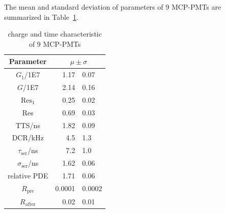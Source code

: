 The mean and standard deviation of parameters of 9 MCP-PMTs are summarized in Table~\ref{tab:summary}.
\begin{table}
    \centering
    \caption{charge and time characteristic of 9 MCP-PMTs}
    \label{tab:summary}
    \begin{tabular}{c| r @{$\pm$} l}
        Parameter&\multicolumn{2}{c}{$\mu\pm\sigma$}\\
        \hline
        $G_1$/1E7&1.17&0.07\\
        $G$/1E7&2.14&0.16\\
        $\mathrm{Res}_1$&0.25&0.02\\
        Res&0.69&0.03\\
        TTS/ns&1.82&0.09\\
        DCR/kHz&4.5&1.3\\
        $\tau_{\mathrm{ser}}$/ns&7.2&1.0\\
        $\sigma_{\mathrm{ser}}$/ns&1.62&0.06\\
        relative PDE&1.71&0.06\\
        $R_{\mathrm{pre}}$&0.0001&0.0002\\
        $R_{\mathrm{after}}$&0.02&0.01\\
        \hline
    \end{tabular}
\end{table}